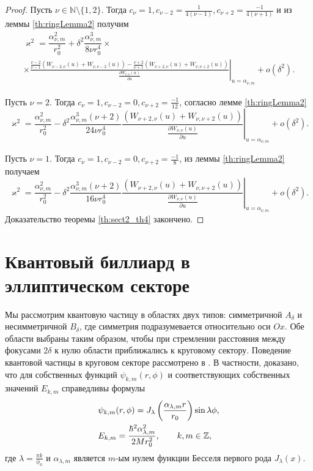 \begin{proof}
Пусть $\nu \in \mathbb{N} \setminus \{1, 2\}$. Тогда $c_\nu=1,
	c_{\nu-2} = \frac{1}{4(\nu-1)}, c_{\nu+2} = \frac{-1}{4(\nu+1)}$ и из леммы \ref{th:ringLemma2}  получим
\begin{multline*}
\varkappa^2 = \dfrac{\alpha_{\nu, m}^2}{r_0^2} + \delta^2 \dfrac{\alpha_{\nu, m}^3}{8 \nu r_0^4} \times \\
 \times \left. \frac{
\frac{\nu-2}{\nu-1}
\left(
W_{\nu-2, \nu}(u) + W_{\nu, \nu-2}(u)
\right)- 
\frac{\nu+2}{\nu+1}
\left(
W_{\nu+2, \nu}(u) + W_{\nu, \nu+2}(u)
\right)
}{ \frac{\partial W_{\nu,\nu}(u)}{\partial u} }\right|_{u=\alpha_{\nu, m}} + o(\delta^2).
\end{multline*}


Пусть $\nu = 2$. Тогда $c_\nu = 1, c_{\nu-2} = 0, c_{\nu+2} = \frac{-1}{12} $, согласно лемме \ref{th:ringLemma2} 
$$\varkappa^2 = \dfrac{\alpha_{\nu, m}^2}{r_0^2} - \delta^2 \dfrac{\alpha_{\nu, m}^3(\nu+2)}{24 \nu  r_0^4} \left. \frac{
	\left(
	W_{\nu+2, \nu}(u) + W_{\nu, \nu+2}(u)
	\right)
}{ \frac{\partial W_{\nu,\nu}(u)}{\partial u} }\right|_{u=\alpha_{\nu, m}} + o(\delta^2).$$

Пусть $\nu = 1$. Тогда $c_\nu = 1, c_{\nu-2} = 0, c_{\nu+2} = \frac{-1}{8}$, из леммы \ref{th:ringLemma2}  получаем
$$\varkappa^2 = \dfrac{\alpha_{\nu, m}^2}{r_0^2} - \delta^2 \dfrac{\alpha_{\nu, m}^3 (\nu+2)}{16 \nu r_0^4}
\left. \frac{
	\left(
	W_{\nu+2, \nu}(u) + W_{\nu, \nu+2}(u)
	\right)
}{ \frac{\partial W_{\nu,\nu}(u)}{\partial u} }\right|_{u=\alpha_{\nu, m}} + o(\delta^2).$$
Доказательство теоремы \ref{th:sect2_th4} закончено.
\end{proof}

\section{Квантовый биллиард в эллиптическом секторе}\label{sec:ch2/sec2}

Мы рассмотрим квантовую частицу в областях двух типов: симметричной $A_\delta$ и несимметричной $B_\delta$, где симметрия подразумевается относительно оси $Ox$.
Обе области выбраны таким образом, чтобы при стремлении расстояния между фокусами $2 \delta$ к нулю области приближались к круговому сектору.
Поведение квантовой частицы в круговом секторе рассмотрено в \cite{wref13}.
В частности, доказано, что для собственных функций $\psi_{k,m}(r,\phi)$ и соответствующих собственных значений $E_{k,m}$ справедливы формулы
\begin{align}
&\psi_{k, m}(r, \phi) = J_\lambda\left(\frac{\alpha_{\lambda, m}r}{r_0}\right)\sin{\lambda\phi}, \notag \\  
&E_{k,m} = \frac{\hbar^2 \alpha_{\lambda, m}^2}{2M r_0^2},
 \qquad k, m \in \mathbb{Z}, \label{eq:energy0}
\end{align}
где 
$\lambda = \frac{\pi k}{\phi_0}$ и $\alpha_{\lambda, m}$ является
$m$-ым нулем функции Бесселя первого рода $J_\lambda(x)$.

